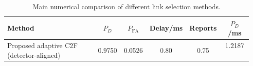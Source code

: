 \begin{table}[t]
    \centering
    \caption{Main numerical comparison of different link selection methods.}
    \label{tab:main_summary}
    \begin{tabular}{l c c c c c}
        \hline
        Method & $P_D$ & $P_{\mathrm{FA}}$ & Delay/ms & Reports & $P_D$/ms \\
        \hline
        Proposed adaptive C2F (detector-aligned) & 0.9750 & 0.0526 & 0.80 & 0.75 & 1.2187 \
        \hline
    \end{tabular}
\end{table}
